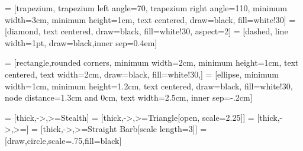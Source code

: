 \usetikzlibrary{shapes.geometric, arrows, fit, calc, automata, positioning, arrows.meta, decorations.markings}

 = [trapezium, trapezium left angle=70, trapezium right angle=110, minimum width=3cm, minimum height=1cm, text centered, draw=black, fill=white!30]
 = [diamond, text centered, draw=black, fill=white!30, aspect=2]
 = [dashed, line width=1pt, draw=black,inner sep=0.4em]

\newcommand\coordSys[2]{
    \draw[step=1cm,gray, thick] (-.25,-.25) grid (#1.9,#2.9);
    \draw[thick,->] (0,0) -- (#1.5,0) node[anchor=north west] {$x$};
    \draw[thick,->] (0,0) -- (0,#2.5) node[anchor=south east] {$y$};
    \foreach \x in {0,...,#1}
       \draw (\x cm,1pt) -- (\x cm,-1pt) node[below=.2cm] {$\x$};
    \foreach \y in {0,...,#2}
        \draw (1pt,\y cm) -- (-1pt,\y cm) node[left=.2cm] {$\y$};
}

\newcommand\drawDBM[2]{\filldraw[fill=#2, draw=black] foreach \p in #1 {-- \p} -- cycle;}




\def\bottom#1#2{\hbox{\vbox to #1{\vfill\hbox{#2}}}}
 = [rectangle,rounded corners, minimum width=2cm, minimum height=1cm, text centered, text width=2cm, draw=black, fill=white!30,]
 = [ellipse, minimum width=1cm, minimum height=1.2cm,
text centered, draw=black, fill=white!30, node distance=1.3cm and 0cm, text width=2.5cm, inner sep=-.2cm]

 = [thick,->,>=Stealth]
 = [thick,->,>={Triangle[open, scale=2.25]}]
 = [thick,->,>=]
 = [thick,->,>={Straight Barb[scale length=3]}]
 = [draw,circle,scale=.75,fill=black]

